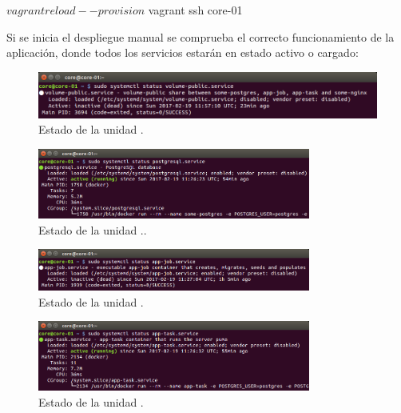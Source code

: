 \begin{code}
$ vagrant reload --provision
$ vagrant ssh core-01
\end{code}

Si se inicia el despliegue manual se comprueba el correcto funcionamiento de la aplicación, donde todos los servicios estarán en estado activo o cargado:

\begin{figure}[H]
\centering
\includegraphics[width=1\textwidth]{images/figures/volume-public.service.png}
\caption{Estado de la unidad .}
\end{figure}

\begin{figure}[H]
\centering
\includegraphics[width=0.8\textwidth]{images/figures/postgresql.service.png}
\caption{Estado de la unidad ..}
\end{figure}

\begin{figure}[H]
\centering
\includegraphics[width=0.8\textwidth]{images/figures/app-job.service.png}
\caption{Estado de la unidad .}
\end{figure}

\begin{figure}[H]
\centering
\includegraphics[width=0.8\textwidth]{images/figures/app-task.service.png}
\caption{Estado de la unidad .}
\end{figure}

